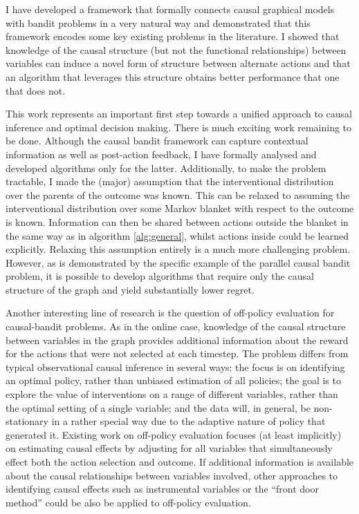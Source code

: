 \documentclass[11pt,a4paper,twoside]{report}
\newcommand{\quotes}[1]{``#1''}
\theoremstyle{plain}
\theoremstyle{definition}
\begin{document}
I have developed a framework that formally connects causal graphical models with bandit problems in a very natural way and demonstrated that this framework encodes some key existing problems in the literature. I showed that knowledge of the causal structure (but not the functional relationships) between variables can induce a novel form of structure between alternate actions and that an algorithm that leverages this structure obtains better performance that one that does not. 

This work represents an important first step towards a unified approach to causal inference and optimal decision making. There is much exciting work remaining to be done. Although the causal bandit framework can capture contextual information as well as post-action feedback, I have formally analysed and developed algorithms only for the latter. Additionally, to make the problem tractable, I made the (major) assumption that the interventional distribution over the parents of the outcome was known. This can be relaxed to assuming the interventional distribution over some Markov blanket with respect to the outcome is known. Information can then be shared between actions outside the blanket in the same way as in algorithm \ref{alg:general}, whilst actions inside could be learned explicitly. Relaxing this assumption entirely is a much more challenging problem. However, as is demonstrated by the specific example of the parallel causal bandit problem, it is possible to develop algorithms that require only the causal structure of the graph and yield substantially lower regret.

Another interesting line of research is the question of off-policy evaluation for causal-bandit problems. As in the online case, knowledge of the causal structure between variables in the graph provides additional information about the reward for the actions that were not selected at each timestep. The problem differs from typical observational causal inference in several ways: the focus is on identifying an optimal policy, rather than unbiased estimation of all policies; the goal is to explore the value of interventions on a range of different variables, rather than the optimal setting of a single variable; and the data will, in general, be non-stationary in a rather special way due to the adaptive nature of policy that generated it. Existing work on off-policy evaluation focuses (at least implicitly) on estimating causal effects by adjusting for all variables that simultaneously effect both the action selection and outcome. If additional information is available about the causal relationships between variables involved, other approaches to identifying causal effects such as instrumental variables or the \quotes{front door method} \citep{Pearl2000} could be also be applied to off-policy evaluation. 
\end{document}

